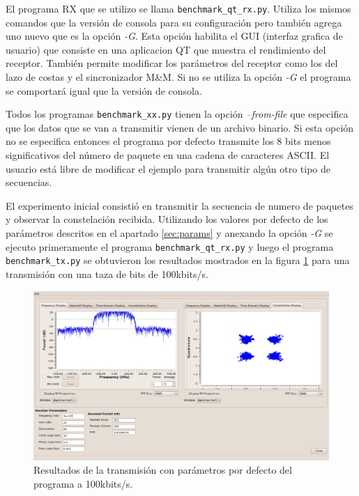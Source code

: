 El programa RX que se utilizo se llama \verb|benchmark_qt_rx.py|. Utiliza los mismos comandos que la
versi\'on de consola para su configuraci\'on pero tambi\'en agrega uno nuevo que es la opci\'on
\emph{-G}. Esta opci\'on habilita el GUI (interfaz grafica de usuario) que consiste en una
aplicacion QT que muestra el rendimiento del receptor. Tambi\'en permite modificar los par\'ametros
del receptor como los del lazo de costas y el sincronizador M\&M. Si no se utiliza la opci\'on
\emph{-G} el programa se comportar\'a igual que la versi\'on de consola.

Todos los programas \verb|benchmark_xx.py| tienen la opci\'on \emph{--from-file} que especifica que
los datos que se van a transmitir vienen de un archivo binario. Si esta opci\'on no se especifica
entonces el programa por defecto transmite los 8 bits menos significativos del n\'umero de paquete
en una cadena de caracteres ASCII. El usuario est\'a libre de modificar el ejemplo para transmitir
alg\'un otro tipo de secuencias.

El experimento inicial consisti\'o en transmitir la secuencia de numero de paquetes y
observar la constelaci\'on recibida. Utilizando los valores por defecto de los par\'ametros descritos en
el apartado \ref{sec:params} y anexando la opci\'on \emph{-G} se ejecuto primeramente el programa
\verb|benchmark_qt_rx.py| y luego el programa \verb|benchmark_tx.py| se obtuvieron los resultados
mostrados en la figura \ref{fig:dqpsktrans} para una transmisi\'on con una taza de bits de
100kbits/s.

\begin{figure}[htp]
  \centering
  \includegraphics[width=5.9in]{figs/dqpsktrans}
  \vspace{0.3in}
  \caption{Resultados de la transmisi\'on con par\'ametros por defecto del programa a 100kbits/s.}
  \label{fig:dqpsktrans}
\end{figure}

